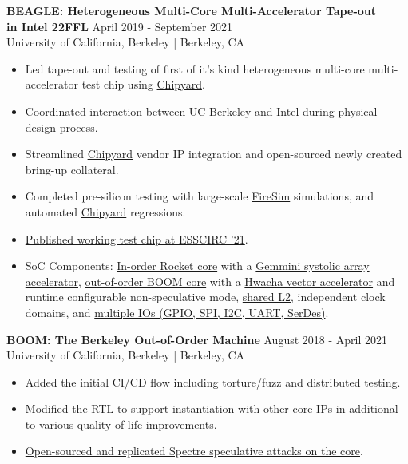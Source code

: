\documentclass[line]{res}
\begin{document}
\begin{resume}
\label{sec:beagle}
\textbf{BEAGLE: Heterogeneous Multi-Core Multi-Accelerator Tape-out\\in Intel 22FFL} \hfill April 2019 - September 2021
\\
University of California, Berkeley | Berkeley, CA
\\
\vspace{-3mm}
\begin{itemize}
\item Led tape-out and testing of first of it's kind heterogeneous multi-core multi-accelerator test chip using \hyperref[sec:chipyard]{Chipyard}.
\item Coordinated interaction between UC Berkeley and Intel during physical design process.
\item Streamlined \hyperref[sec:chipyard]{Chipyard} vendor IP integration and open-sourced newly created bring-up collateral.
\item Completed pre-silicon testing with large-scale \hyperref[sec:firesim]{FireSim} simulations, and automated \hyperref[sec:chipyard]{Chipyard} regressions.
\item \hyperref[sec:beaglepaper]{Published working test chip at ESSCIRC '21}.
\item SoC Components: \href{https://www2.eecs.berkeley.edu/Pubs/TechRpts/2016/EECS-2016-17.pdf}{In-order Rocket core} with a \href{https://dl.acm.org/doi/10.1109/DAC18074.2021.9586216}{Gemmini systolic array accelerator}, \hyperref[sec:boom]{out-of-order BOOM core} with a \href{https://people.eecs.berkeley.edu/~krste/papers/EECS-2015-263.pdf}{Hwacha vector accelerator} and runtime configurable non-speculative mode, \href{https://github.com/chipsalliance/rocket-chip-inclusive-cache}{shared L2}, independent clock domains, and \href{https://github.com/chipsalliance/rocket-chip-blocks}{multiple IOs (GPIO, SPI, I2C, UART, SerDes)}.
\end{itemize}

\label{sec:boom}
\textbf{BOOM: The Berkeley Out-of-Order Machine} \hfill August 2018 - April 2021
\\
University of California, Berkeley | Berkeley, CA
\\
\vspace{-3mm}
\begin{itemize}
\item Added the initial CI/CD flow including torture/fuzz and distributed testing.
\item Modified the RTL to support instantiation with other core IPs in additional to various quality-of-life improvements.
\item \hyperref[sec:spectrerepl]{Open-sourced and replicated Spectre speculative attacks on the core}.
\end{itemize}


\end{resume}
\end{document}
